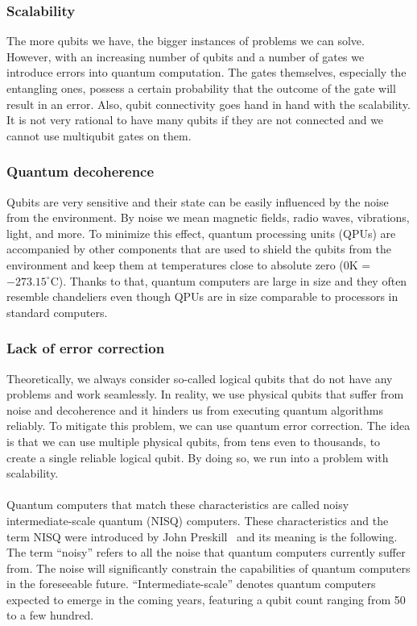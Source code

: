 \subsubsection{Scalability}
The more qubits we have, the bigger instances of problems we can solve. However, with an increasing number of qubits and a number of gates we introduce errors into quantum computation. The gates themselves, especially the entangling ones, possess a certain probability that the outcome of the gate will result in an error. Also, qubit connectivity goes hand in hand with the scalability. It is not very rational to have many qubits if they are not connected and we cannot use multiqubit gates on them.

\subsubsection{Quantum decoherence}
Qubits are very sensitive and their state can be easily influenced by the noise from the environment. By noise we mean magnetic fields, radio waves, vibrations, light, and more. To minimize this effect, quantum processing units (QPUs) are accompanied by other components that are used to shield the qubits from the environment and keep them at temperatures close to absolute zero ($0$K = $-273.15^{\circ}$C). Thanks to that, quantum computers are large in size and they often resemble chandeliers even though QPUs are in size comparable to processors in standard computers.

\subsubsection{Lack of error correction}
Theoretically, we always consider so-called logical qubits that do not have any problems and work seamlessly. In reality, we use physical qubits that suffer from noise and decoherence and it hinders us from executing quantum algorithms reliably. To mitigate this problem, we can use quantum error correction. The idea is that we can use multiple physical qubits, from tens even to thousands, to create a single reliable logical qubit. By doing so, we run into a problem with scalability. 

\paragraph{}
Quantum computers that match these characteristics are called noisy intermediate-scale quantum (NISQ) computers. These characteristics and the term NISQ were introduced by John Preskill~\cite{nisq} and its meaning is the following. The term ``noisy'' refers to all the noise that quantum computers currently suffer from. The noise will significantly constrain the capabilities of quantum computers in the foreseeable future. ``Intermediate-scale'' denotes quantum computers expected to emerge in the coming years, featuring a qubit count ranging from 50 to a few hundred. 

